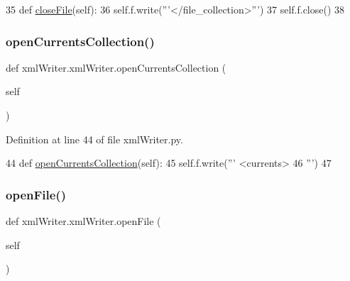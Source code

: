 \begin{DoxyCode}
35     \textcolor{keyword}{def }\mbox{\hyperlink{classxml_writer_1_1xml_writer_ad0738ca597cf9a517e13e50bb3be5c96}{closeFile}}(self):
36         self.f.write(\textcolor{stringliteral}{'''</file\_collection>'''})
37         self.f.close()
38         
\end{DoxyCode}
\mbox{\label{classxml_writer_1_1xml_writer_a69b2a24925be449bc0e416e4cd2d3816}} 
\subsubsection{\texorpdfstring{open\+Currents\+Collection()}{openCurrentsCollection()}}
{\footnotesize\ttfamily def xml\+Writer.\+xml\+Writer.\+open\+Currents\+Collection (\begin{DoxyParamCaption}\item[{}]{self }\end{DoxyParamCaption})}



Definition at line 44 of file xml\+Writer.\+py.


\begin{DoxyCode}
44     \textcolor{keyword}{def }\mbox{\hyperlink{classxml_writer_1_1xml_writer_a69b2a24925be449bc0e416e4cd2d3816}{openCurrentsCollection}}(self):
45         self.f.write(\textcolor{stringliteral}{'''    <currents>}
46 \textcolor{stringliteral}{'''})
47         
\end{DoxyCode}
\mbox{\label{classxml_writer_1_1xml_writer_a9697485604ee2a4be4fff52911fea34f}} 
\subsubsection{\texorpdfstring{open\+File()}{openFile()}}
{\footnotesize\ttfamily def xml\+Writer.\+xml\+Writer.\+open\+File (\begin{DoxyParamCaption}\item[{}]{self }\end{DoxyParamCaption})}



